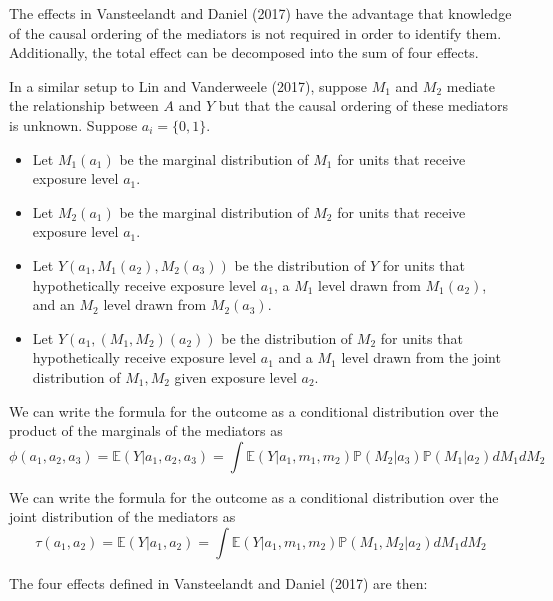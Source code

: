 \documentclass[12pt]{article} %
\numberwithin{equation}{section} %
\begin{document}
The effects in Vansteelandt and Daniel (2017) have the advantage that knowledge of the causal ordering of the mediators is not
required in order to identify them. Additionally, the total effect can be decomposed into the sum of four effects. 

In a similar setup to Lin and Vanderweele (2017), suppose $M_{1}$ and $M_{2}$ mediate the relationship between $A$ and $Y$ but
that the causal ordering of these mediators is unknown. Suppose $a_{i} = \{0, 1\}$. 
\begin{itemize}
\item Let $M_{1}(a_{1})$ be the marginal distribution of $M_{1}$ for units that receive exposure level $a_{1}$. 
\item Let $M_{2}(a_{1})$ be the marginal distribution of $M_{2}$ for units
that receive exposure level $a_{1}$.
\item Let $Y(a_{1},M_{1}(a_{2}),M_2(a_{3}))$ be the distribution of $Y$ for units
that hypothetically receive exposure level $a_{1}$, a $M_{1}$ level drawn from $M_{1}(a_{2})$,
and an $M_{2}$ level drawn from $M_{2}(a_{3})$.
\item Let $Y(a_{1},(M_{1},M_{2})(a_{2}))$ be the distribution of $M_{2}$ for units
that hypothetically receive exposure level $a_{1}$ and a $M_{1}$ level drawn from the joint distribution of $M_{1}, M_{2}$ given
exposure level $a_{2}$. 
\end{itemize}

We can write the formula for the outcome as a conditional distribution over the product of the marginals of the mediators as 
$$\phi(a_{1},a_{2},a_{3}) = \mathbb{E}(Y|a_{1},a_{2},a_{3}) = \int \mathbb{E}(Y|a_{1},m_{1},m_{2})\mathbb{P}(M_{2}|a_{3})\mathbb{P}(M_{1}|a_{2})dM_{1}dM_{2}$$

We can write the formula for the outcome as a conditional distribution over the joint distribution of the mediators as 
$$\tau(a_{1},a_{2}) = \mathbb{E}(Y|a_{1},a_{2}) = \int \mathbb{E}(Y|a_{1},m_{1},m_{2})\mathbb{P}(M_{1}, M_{2}|a_{2})dM_{1}dM_{2}$$

The four effects defined in Vansteelandt and Daniel (2017) are then: 
\end{document}
